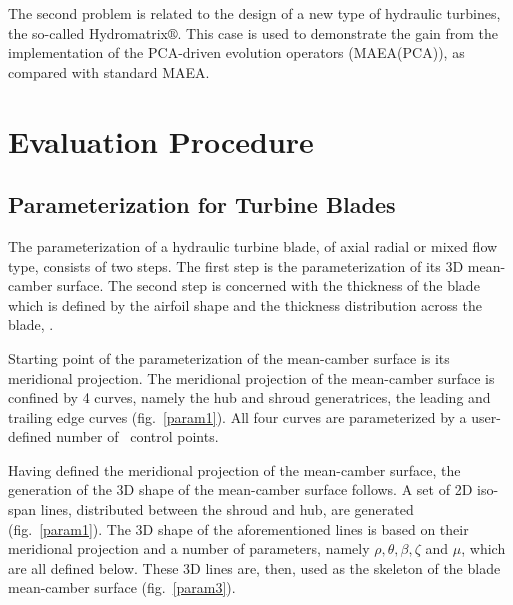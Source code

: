 The second problem is related to the design of a new type of hydraulic turbines, the so-called Hydromatrix$\circledR$. This case is used to demonstrate the gain from the implementation of the PCA-driven evolution operators (MAEA(PCA)), as compared with standard MAEA.     

      
\section{Evaluation Procedure}
\label{ParamEval}
\subsection{Parameterization for Turbine Blades}
\label{Paramt}
The  parameterization of a hydraulic turbine blade, of axial radial or mixed flow type, consists of two steps. The first step is the parameterization of its 3D mean-camber surface. The second step is concerned with the thickness of the blade which is defined by the airfoil shape and the thickness distribution across the blade, \cite{dipl_livia,dipl_simon}.

Starting point of the parameterization of the mean-camber surface is its meridional projection. The meridional projection of the mean-camber surface is confined by 4 curves, namely the hub and shroud generatrices, the leading and trailing edge curves (fig.\ \ref{param1}). All four curves are parameterized by a user-defined number of \Bezier\ control points.



Having defined the meridional projection of the mean-camber surface,  the generation of the 3D shape of the mean-camber surface follows. A set of 2D iso-span lines, distributed between the shroud and hub,  are generated (fig.\ \ref{param1}). The 3D shape of the aforementioned lines is  based on their meridional projection and a number of parameters, namely $\rho,\theta,\beta,\zeta$ and $\mu$, which are all defined below. These 3D lines are, then, used as the skeleton of the blade mean-camber surface (fig.\ \ref{param3}).

